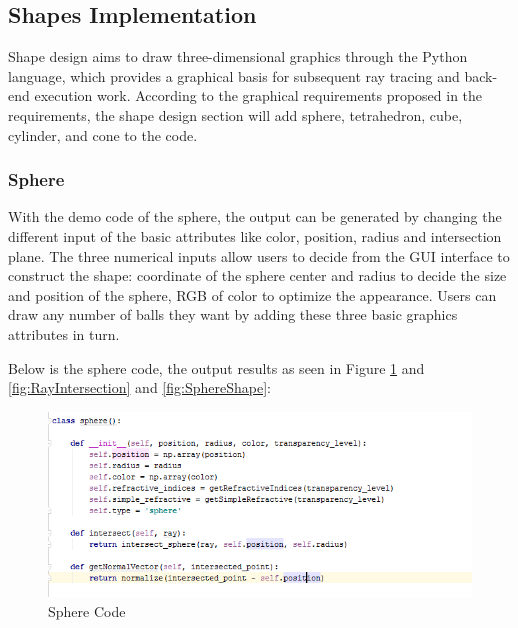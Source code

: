 \documentclass[a4paper, 12pt]{article}
\begin{document}
\subsection{Shapes Implementation}
Shape design aims to draw three-dimensional graphics through the Python language, which provides a graphical basis for subsequent ray tracing and back-end execution work. According to the graphical requirements proposed in the requirements, the shape design section will add sphere, tetrahedron, cube, cylinder, and cone to the code.

\subsubsection{Sphere}
With the demo code of the sphere, the output can be generated by changing the different input of the basic attributes like color, position, radius and intersection plane. The three numerical inputs allow users to decide from the GUI interface to construct the shape: coordinate of the sphere center and radius to decide the size and position of the sphere, RGB of color to optimize the appearance. Users can draw any number of balls they want by adding these three basic graphics attributes in turn.

Below is the sphere code, the output results as seen in Figure \ref{fig:Sphere Code} and \ref{fig:RayIntersection} and \ref{fig:SphereShape}:

\begin{figure}[h]
\centering
\includegraphics[scale=0.6]{ShD_Sphere_code.png}
  \caption{Sphere Code}
  \label{fig:Sphere Code}
\end{figure}
\end{document}
